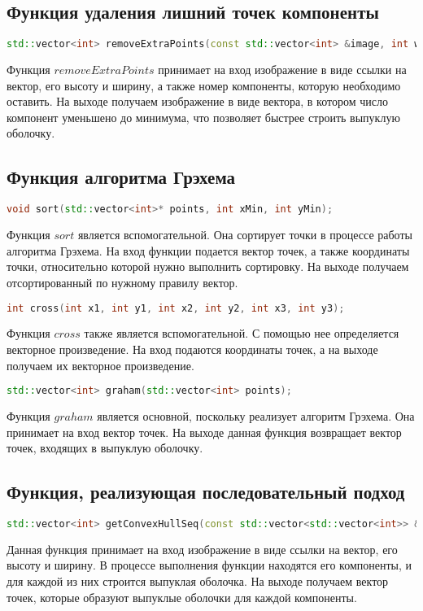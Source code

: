 \documentclass[a4paper, 12pt]{extarticle}
\begin{document}
	\subsection{Функция удаления лишний точек компоненты}
	\begin{lstlisting}[language=C++]
		std::vector<int> removeExtraPoints(const std::vector<int> &image, int width, int height, int component);
	\end{lstlisting}
	Функция $removeExtraPoints$ принимает на вход изображение в виде ссылки на вектор, его высоту и ширину, а также номер компоненты, которую необходимо оставить. На выходе получаем изображение в виде вектора, в котором число компонент уменьшено до минимума, что позволяет быстрее строить выпуклую оболочку.
	
	\subsection{Функция алгоритма Грэхема}
	\begin{lstlisting}[language=C++]
		void sort(std::vector<int>* points, int xMin, int yMin);
	\end{lstlisting}
	Функция $sort$ является вспомогательной. Она сортирует точки в процессе работы алгоритма Грэхема. На вход функции подается вектор точек, а также координаты точки, относительно которой нужно выполнить сортировку. На выходе получаем отсортированный по нужному правилу вектор.
	\begin{lstlisting}[language=C++]
		int cross(int x1, int y1, int x2, int y2, int x3, int y3);
	\end{lstlisting}
	Функция $cross$ также является вспомогательной. С помощью нее определяется векторное произведение. На вход подаются координаты точек, а на выходе получаем их векторное произведение.
	\begin{lstlisting}[language=C++]
		std::vector<int> graham(std::vector<int> points);
	\end{lstlisting}
	Функция $graham$ является основной, поскольку реализует алгоритм Грэхема. Она принимает на вход вектор точек. На выходе данная функция возвращает вектор точек, входящих в выпуклую оболочку.
	
	\subsection{Функция, реализующая последовательный подход}
	\begin{lstlisting}[language=C++]
		std::vector<int> getConvexHullSeq(const std::vector<std::vector<int>> &image, int width, int height);
	\end{lstlisting}
	Данная функция принимает на вход изображение в виде ссылки на вектор, его высоту и ширину. В процессе выполнения функции находятся его компоненты, и для каждой из них строится выпуклая оболочка. На выходе получаем вектор точек, которые образуют выпуклые оболочки для каждой компоненты.
	
\end{document}
